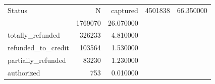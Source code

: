 \begin{tabular}{lrr}
\toprule
Status & N & %
\midrule
captured & 4501838 & 66.350000 \\
 & 1769070 & 26.070000 \\
totally_refunded & 326233 & 4.810000 \\
refunded_to_credit & 103564 & 1.530000 \\
partially_refunded & 83230 & 1.230000 \\
authorized & 753 & 0.010000 \\
\bottomrule
\end{tabular}
